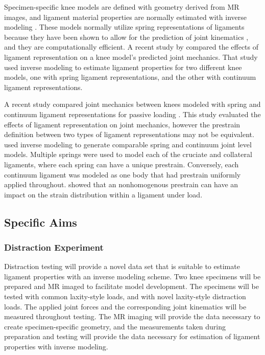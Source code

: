 Specimen-specific knee models are defined with geometry derived from MR images, and ligament material properties are normally estimated with inverse modeling \citep{blankevoort_validation_1996,baldwin_dynamic_2012,ewing_estimating_2015,harris_combined_2016}. These models normally utilize spring representations of ligaments because they have been shown to allow for the prediction of joint kinematics \citep{weiss_computational_2001}, and they are computationally efficient. A recent study by \cite{beidokhti_influence_2017} compared the effects of ligament representation on a knee model's predicted joint mechanics. That study used inverse modeling to estimate ligament properties for two different knee models, one with spring ligament representations, and the other with continuum ligament representations. 

A recent study compared joint mechanics between knees modeled with spring and continuum ligament representations for passive loading \citep{beidokhti_influence_2017}. This study evaluated the effects of ligament representation on joint mechanics, however the prestrain definition between two types of ligament representations may not be equivalent. \cite{beidokhti_influence_2017} used inverse modeling to generate comparable spring and continuum joint level models. Multiple springs were used to model each of the cruciate and collateral ligaments, where each spring can have a unique prestrain. Conversely, each continuum ligament was modeled as one body that had prestrain uniformly applied throughout. \cite{gardiner_subject-specific_2003} showed that an nonhomogenous prestrain can have an impact on the strain distribution within a ligament under load. 



\subsection{Specific Aims}
\subsubsection{Distraction Experiment}
Distraction testing will provide a novel data set that is suitable to estimate ligament properties with an inverse modeling scheme. Two knee specimens will be prepared and MR imaged to facilitate model development. The specimens will be tested with common laxity-style loads, and with novel laxity-style distraction loads. The applied joint forces and the corresponding joint kinematics will be measured throughout testing. The MR imaging will provide the data necessary to create specimen-specific geometry, and the measurements taken during preparation and testing will provide the data necessary for estimation of ligament properties with inverse modeling.

